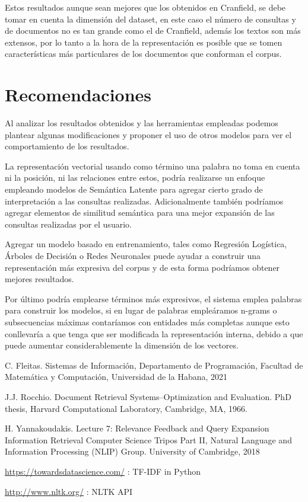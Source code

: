 \documentclass[runningheads,a4paper]{llncs}
\begin{document}
Estos resultados aunque sean mejores que los obtenidos en Cranfield, se debe tomar en cuenta la dimensión del dataset, en este caso el número de consultas y de documentos no es tan grande como el de Cranfield, además los textos son más extensos, por lo tanto a la hora de la representación es posible que se tomen características más particulares de los documentos que conforman el corpus. 

\section{Recomendaciones}

Al analizar los resultados obtenidos y las herramientas empleadas podemos plantear algunas modificaciones y proponer el uso de otros modelos para ver el comportamiento de los resultados.

La representación vectorial usando como término una palabra no toma en cuenta ni la posición, ni las relaciones entre estos, podría realizarse un enfoque empleando modelos de Semántica Latente para agregar cierto grado de interpretación a las consultas realizadas. Adicionalmente también podríamos agregar elementos de 
similitud semántica para una mejor expansión de las consultas realizadas por el usuario.

Agregar un modelo basado en entrenamiento, tales como Regresión Logística, Árboles de Decisión o Redes Neuronales puede ayudar a construir una representación más expresiva del corpus y de esta forma podríamos obtener mejores resultados. 

Por último podría emplearse términos más expresivos, el sistema emplea palabras para construir los modelos, si en lugar de palabras empleáramos n-grams o subsecuencias máximas contaríamos con entidades más completas aunque esto conllevaría a que tenga que ser modificada la representación interna, debido a que puede aumentar considerablemente la dimensión de los vectores.

\begin{thebibliography}{4}

 C. Fleitas. Sistemas de Información, Departamento de Programación, Facultad de Matemática y Computación, Universidad de la Habana, 2021

 J.J. Rocchio. Document Retrieval Systems–Optimization and Evaluation.
PhD thesis, Harvard Computational Laboratory, Cambridge, MA, 1966.

 H. Yannakoudakis. Lecture 7: Relevance Feedback and Query
Expansion Information Retrieval Computer Science Tripos Part II, Natural Language and Information Processing (NLIP) Group. University of Cambridge, 2018 

 \url{https://towardsdatascience.com/} : TF-IDF in Python

 \url{http://www.nltk.org/} : NLTK API

\end{thebibliography}
\end{document}
